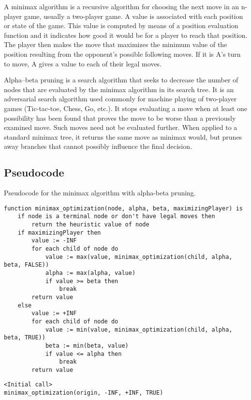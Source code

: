 \documentclass[twoside,10pt]{article}
\begin{document}
A minimax algorithm is a recursive algorithm for choosing the next move in an n-player game, usually a two-player game. A value is associated with each position or state of the game. This value is computed by means of a position evaluation function and it indicates how good it would be for a player to reach that position. The player then makes the move that maximizes the minimum value of the position resulting from the opponent's possible following moves. If it is A's turn to move, A gives a value to each of their legal moves.
\vspace{0.3cm}

Alpha–beta pruning is a search algorithm that seeks to decrease the number of nodes that are evaluated by the minimax algorithm in its search tree. It is an adversarial search algorithm used commonly for machine playing of two-player games (Tic-tac-toe, Chess, Go, etc.). It stops evaluating a move when at least one possibility has been found that proves the move to be worse than a previously examined move. Such moves need not be evaluated further. When applied to a standard minimax tree, it returns the same move as minimax would, but prunes away branches that cannot possibly influence the final decision.

\newpage

\subsection*{Pseudocode}

Pseudocode for the minimax algorithm with alpha-beta pruning.

\begin{tcolorbox}[boxrule=0pt]
    \begin{verbatim}
function minimax_optimization(node, alpha, beta, maximizingPlayer) is
    if node is a terminal node or don't have legal moves then
        return the heuristic value of node
    if maximizingPlayer then
        value := -INF
        for each child of node do
            value := max(value, minimax_optimization(child, alpha, beta, FALSE))
            alpha := max(alpha, value)
            if value >= beta then
                break 
        return value
    else
        value := +INF
        for each child of node do
            value := min(value, minimax_optimization(child, alpha, beta, TRUE))
            beta := min(beta, value)
            if value <= alpha then
                break 
        return value
    \end{verbatim}
\end{tcolorbox}
\begin{tcolorbox}[boxrule=0pt]
    \begin{verbatim}
<Initial call>
minimax_optimization(origin, -INF, +INF, TRUE)
\end{verbatim}
\end{tcolorbox}
\end{document}
